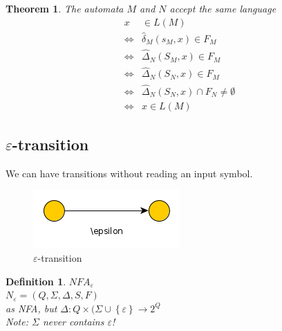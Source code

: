 \documentclass[a4paper]{article}
\newtheorem{definition}{Definition}
\newtheorem{theorem}{Theorem}
\begin{document}
        \begin{theorem}
            The automata $M$ and $N$ accept the same language
            \begin{align*}
                x&\in L(M)\\
                \Leftrightarrow &\hat{\delta}_M(s_M,x)\in F_M\\
                \Leftrightarrow &\hat{\Delta}_N(S_M,x)\in F_M\\
                \Leftrightarrow &\hat{\Delta}_N(S_N,x)\in F_M\\
                \Leftrightarrow &\hat{\Delta}_N(S_N,x)\cap F_N \neq \emptyset\\
                \Leftrightarrow &x\in L(M)
            \end{align*}
        \end{theorem}
        \subsection{$\varepsilon$-transition}
        We can have transitions without reading an input symbol.
        \begin{figure}[H]
            \centering
            \includegraphics{epsilon.png}
            \caption{$\varepsilon$-transition}
            \label{fig:epstrans}
        \end{figure}
        \begin{definition}
            $NFA_\varepsilon$\\
            $N_\varepsilon = \left( Q,\Sigma, \Delta, S, F \right)$\\
            as NFA, but $\Delta: Q\times (\Sigma\cup \left\{ \varepsilon \right\}
            \rightarrow 2^Q$\\
            Note: $\Sigma$ never contains $\varepsilon$!
        \end{definition}
\end{document}
